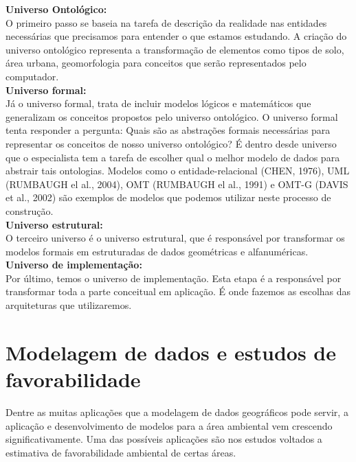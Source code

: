 	

	\textbf{Universo Ontológico:} \\

	O primeiro passo se baseia na tarefa de descrição da realidade nas entidades necessárias que precisamos para entender o que estamos estudando.  A criação do universo ontológico representa a transformação de elementos como tipos de solo, área urbana, geomorfologia para conceitos que serão representados pelo computador. \\
	
	\textbf{Universo formal:} \\
		
	Já o universo formal, trata de incluir modelos lógicos e matemáticos que generalizam os conceitos propostos pelo universo ontológico. O universo formal tenta responder a pergunta: Quais são as abstrações formais necessárias para representar os conceitos de nosso universo ontológico? É dentro desde universo que o especialista tem a tarefa de escolher qual o melhor modelo de dados para abstrair tais ontologias. Modelos como o entidade-relacional (CHEN, 1976), UML (RUMBAUGH el al., 2004), OMT (RUMBAUGH el al., 1991) e OMT-G (DAVIS et al., 2002) são exemplos de modelos que podemos utilizar neste processo de construção. \\
	
	\textbf{Universo estrutural:} \\
	
	O terceiro universo é o universo estrutural, que é responsável por transformar os modelos formais em estruturadas de dados geométricas e alfanuméricas. \\
	
	\textbf{Universo de implementação:} \\
	
	 Por último, temos o universo de implementação. Esta etapa é a responsável por transformar toda a parte conceitual em aplicação. É onde fazemos as escolhas das arquiteturas que utilizaremos.
	 
	 \section{Modelagem de dados e estudos de favorabilidade}
	 
	 Dentre as muitas aplicações que a modelagem de dados geográficos pode servir, a aplicação e desenvolvimento de modelos para a área ambiental vem crescendo significativamente.  Uma das possíveis aplicações são nos estudos voltados a estimativa de favorabilidade ambiental de certas áreas.
	 

